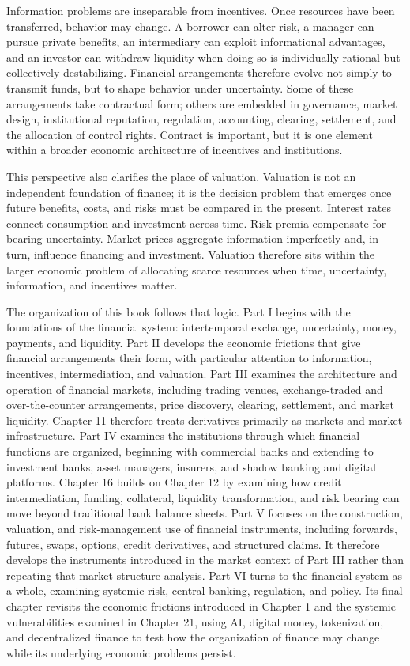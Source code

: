Information problems are inseparable from incentives. Once resources have been transferred, behavior may change. A borrower can alter risk, a manager can pursue private benefits, an intermediary can exploit informational advantages, and an investor can withdraw liquidity when doing so is individually rational but collectively destabilizing. Financial arrangements therefore evolve not simply to transmit funds, but to shape behavior under uncertainty. Some of these arrangements take contractual form; others are embedded in governance, market design, institutional reputation, regulation, accounting, clearing, settlement, and the allocation of control rights. Contract is important, but it is one element within a broader economic architecture of incentives and institutions.

This perspective also clarifies the place of valuation. Valuation is not an independent foundation of finance; it is the decision problem that emerges once future benefits, costs, and risks must be compared in the present. Interest rates connect consumption and investment across time. Risk premia compensate for bearing uncertainty. Market prices aggregate information imperfectly and, in turn, influence financing and investment. Valuation therefore sits within the larger economic problem of allocating scarce resources when time, uncertainty, information, and incentives matter.

The organization of this book follows that logic. Part I begins with the foundations of the financial system: intertemporal exchange, uncertainty, money, payments, and liquidity. Part II develops the economic frictions that give financial arrangements their form, with particular attention to information, incentives, intermediation, and valuation. Part III examines the architecture and operation of financial markets, including trading venues, exchange-traded and over-the-counter arrangements, price discovery, clearing, settlement, and market liquidity. Chapter 11 therefore treats derivatives primarily as markets and market infrastructure. Part IV examines the institutions through which financial functions are organized, beginning with commercial banks and extending to investment banks, asset managers, insurers, and shadow banking and digital platforms. Chapter 16 builds on Chapter 12 by examining how credit intermediation, funding, collateral, liquidity transformation, and risk bearing can move beyond traditional bank balance sheets. Part V focuses on the construction, valuation, and risk-management use of financial instruments, including forwards, futures, swaps, options, credit derivatives, and structured claims. It therefore develops the instruments introduced in the market context of Part III rather than repeating that market-structure analysis. Part VI turns to the financial system as a whole, examining systemic risk, central banking, regulation, and policy. Its final chapter revisits the economic frictions introduced in Chapter 1 and the systemic vulnerabilities examined in Chapter 21, using AI, digital money, tokenization, and decentralized finance to test how the organization of finance may change while its underlying economic problems persist.

